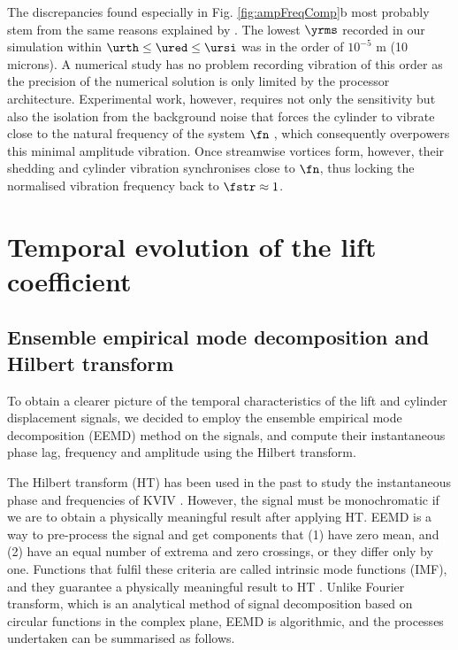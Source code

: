 \documentclass[a4paper,fleqn]{cas-sc}
\begin{document}
The discrepancies found especially in Fig. \ref{fig:ampFreqComp}b most probably stem from the same reasons explained by \citet{Nguyen2012}. The lowest  $\yrms$ recorded in our simulation within  $\urth \leq \ured \leq \ursi$ was in the order of $10^{-5}$ \si{\metre} (10 microns). A numerical study has no problem recording vibration of this order as the precision of the numerical solution is only limited by the processor architecture. Experimental work, however, requires not only the sensitivity but also the isolation from the background noise that forces the cylinder to vibrate close to the natural frequency of the system  $\fn$ \citep{Nguyen2012}, which consequently overpowers this minimal amplitude vibration. Once streamwise vortices form, however, their shedding and cylinder vibration synchronises close to $\fn$, thus locking the normalised vibration frequency back to  $\fstr \approx 1$.


\section{Temporal evolution of the lift coefficient} \label{sec:tempEvo}

\subsection{Ensemble empirical mode decomposition and Hilbert transform} \label{ssec:eemd}
To obtain a clearer picture of the temporal characteristics of the lift and cylinder displacement signals, we decided to employ the ensemble empirical mode decomposition (EEMD) method \citep{Huang1998,Wu2008} on the signals, and compute their instantaneous phase lag, frequency and amplitude using the Hilbert transform.

The Hilbert transform (HT) has been used in the past to study the instantaneous phase and frequencies of KVIV \citep{Khalak1999}. However, the signal must be monochromatic if we are to obtain a physically meaningful result after applying HT. EEMD is a way to pre-process the signal and get components that (1) have zero mean, and (2) have an equal number of extrema and zero crossings, or they differ only by one. Functions that fulfil these criteria are called intrinsic mode functions (IMF), and they guarantee a physically meaningful result to HT \citep{Gumelar2019,Zhou2019}. Unlike Fourier transform, which is an analytical method of signal decomposition based on circular functions in the complex plane, EEMD is algorithmic, and the processes undertaken can be summarised as follows.
\end{document}
